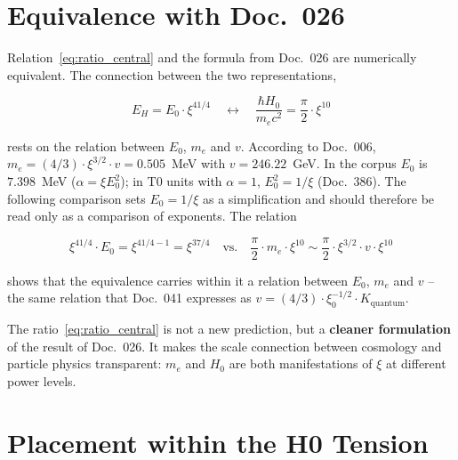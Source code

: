 \section{Equivalence with Doc.~026}
\label{sec:aequivalenz}

Relation~\eqref{eq:ratio_central} and the formula from Doc.~026
are numerically equivalent. The connection between the two representations,

\begin{equation}
    E_H = E_0 \cdot \xi^{41/4}
    \quad \longleftrightarrow \quad
    \frac{\hbar H_0}{m_e c^2} = \frac{\pi}{2} \cdot \xi^{10}
\end{equation}

rests on the relation between $E_0$, $m_e$ and $v$. According to Doc.~006,
$m_e = (4/3) \cdot \xi^{3/2} \cdot v = 0.505$~MeV with $v = 246.22$~GeV. In the corpus
$E_0$ is $7.398$~MeV ($\alpha = \xi E_0^2$); in T0 units with $\alpha = 1$,
$E_0^2 = 1/\xi$ (Doc.~386). The following comparison sets $E_0 = 1/\xi$ as a
simplification and should therefore be read only as a comparison of exponents.
The relation

\begin{equation}
    \xi^{41/4} \cdot E_0 = \xi^{41/4 - 1} = \xi^{37/4}
    \quad \text{vs.} \quad
    \frac{\pi}{2} \cdot m_e \cdot \xi^{10} \sim \frac{\pi}{2} \cdot \xi^{3/2} \cdot v \cdot \xi^{10}
\end{equation}

shows that the equivalence carries within it a relation between $E_0$, $m_e$ and $v$
-- the same relation that Doc.~041 expresses as
$v = (4/3) \cdot \xi_0^{-1/2} \cdot K_\text{quantum}$.

\begin{interpretation}
    The ratio~\eqref{eq:ratio_central} is not a new prediction,
    but a \textbf{cleaner formulation} of the result of
    Doc.~026. It makes the scale connection between cosmology
    and particle physics transparent: $m_e$ and $H_0$ are both
    manifestations of $\xi$ at different power levels.
\end{interpretation}

\section{Placement within the H0 Tension}
\label{sec:hubble}

